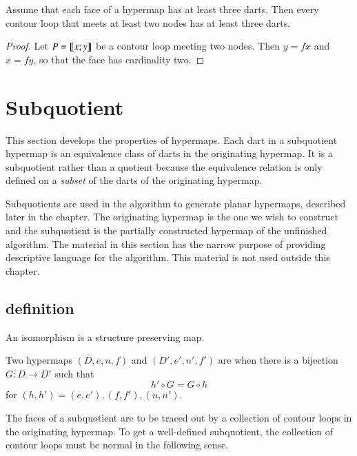 \begin{lemma}\cutrate{}\label{lemma:3dart}  
Assume that each face of a hypermap  has at least three darts.
Then every contour loop that meets at least two nodes has at least
three darts.
\end{lemma}

\begin{proof} Let $P={\llbracket{x;y}\rrbracket}$ be a contour loop meeting two nodes.  Then
$y = f x$ and $x = f y$, so that the face has cardinality two.
\end{proof}


\section{Subquotient}
%

This section develops the properties of 
  hypermaps.  Each dart in a subquotient hypermap is an equivalence
class of darts in the originating hypermap.  It is a subquotient
rather than a quotient because the equivalence relation
is only defined on a {\it subset} of the darts of the originating
hypermap. 

Subquotients are used in the algorithm to generate planar hypermaps, described
later in the chapter.  The
originating hypermap is the one we wish to construct and the subquotient
is the partially constructed hypermap of the unfinished algorithm.  The material
in this section has the narrow purpose  of providing descriptive language for the
algorithm.  This material  is not  used outside this chapter.

\subsection{definition}

An isomorphism is a structure preserving map.

\begin{definition}[isomorphism]
 Two hypermaps $(D,e,n,f)$ and
$(D',e',n',f')$ are  
when there is a bijection
$G:D\to D'$ such that
\[ h'\circ G = G\circ h\] 
for $(h,h')=(e,e'), (f,f'), (n,n')$.
%
\end{definition}

The faces of a subquotient are to be traced out by a collection of contour loops
in the originating hypermap.  To get a well-defined subquotient, the collection
of contour loops must be normal in the following sense.

